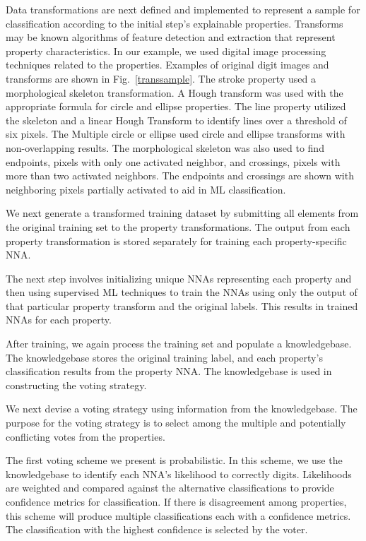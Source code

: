 \documentclass[conference]{IEEEtran}
\begin{document}
Data transformations are next defined and implemented to represent a sample for classification according to the initial step's explainable properties.  Transforms may be known algorithms of feature detection and extraction that represent property characteristics.  In our example, we used digital image processing techniques related to the properties.  Examples of original digit images and transforms are shown in Fig.~\ref{transsample}.  The stroke property used a morphological skeleton transformation.  A Hough transform was used with the appropriate formula for circle and ellipse properties.  The line property utilized the skeleton and a linear Hough Transform to identify lines over a threshold of six pixels.  The Multiple circle or ellipse used circle and ellipse transforms with non-overlapping results.  The morphological skeleton was also used to find endpoints, pixels with only one activated neighbor, and crossings, pixels with more than two activated neighbors.   The endpoints and crossings are shown with neighboring pixels partially activated to aid in ML classification.
 
We next generate a transformed training dataset by submitting all elements from the original training set to the property transformations.  The output from each property transformation is stored separately for training each property-specific NNA. 

The next step involves initializing unique NNAs representing each property and then using supervised ML techniques to train the NNAs using only the output of that particular property transform and the original labels.  This results in trained NNAs for each property.

After training, we again process the training set and populate a knowledgebase.  The knowledgebase stores the original training label, and each property's classification results from the property NNA.  The knowledgebase is used in constructing the voting strategy. 

We next devise a voting strategy using information from the knowledgebase.  The purpose for the voting strategy is to select among the multiple and potentially conflicting votes from the properties.

The first voting scheme we present is probabilistic.  In this scheme, we use the knowledgebase to identify each NNA's likelihood to correctly digits.  Likelihoods are weighted and compared against the alternative classifications to provide confidence metrics for classification.  If there is disagreement among properties, this scheme will produce multiple classifications each with a confidence metrics.  The classification with the highest confidence is selected by the voter.
\end{document}
